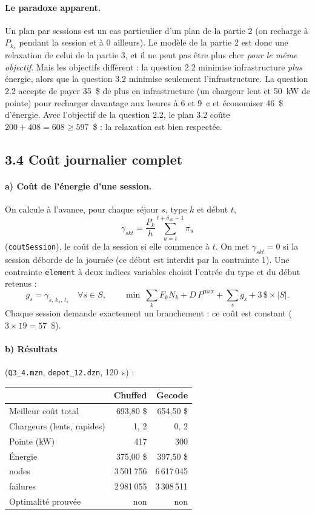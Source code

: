 \documentclass{article}
\begin{document}
\paragraph{Le paradoxe apparent.} Un plan par sessions est un cas particulier d'un plan de la partie 2 (on recharge à $P_{k_s}$ pendant la session et à 0 ailleurs). Le modèle de la partie 2 est donc une relaxation de celui de la partie 3, et il ne peut pas être plus cher \emph{pour le même objectif}. Mais les objectifs diffèrent : la question 2.2 minimise infrastructure \emph{plus} énergie, alors que la question 3.2 minimise seulement l'infrastructure. La question 2.2 accepte de payer 35~\$ de plus en infrastructure (un chargeur lent et 50~kW de pointe) pour recharger davantage aux heures à 6 et 9~¢ et économiser 46~\$ d'énergie. Avec l'objectif de la question 2.2, le plan 3.2 coûte $200 + 408 = 608 \geq 597$~\$ : la relaxation est bien respectée.

\subsection*{3.4 Coût journalier complet}

\paragraph{a) Coût de l'énergie d'une session.} On calcule à l'avance, pour chaque séjour $s$, type $k$ et début $t$,
\[ \gamma_{skt} = \frac{P_k}{h} \sum_{u=t}^{t+\delta_{sk}-1} \pi_u \]
(\texttt{coutSession}), le coût de la session si elle commence à $t$. On met $\gamma_{skt} = 0$ si la session déborde de la journée (ce début est interdit par la contrainte 1). Une contrainte \texttt{element} à deux indices variables choisit l'entrée du type et du début retenus :
\[ g_s = \gamma_{s,\,k_s,\,t_s} \quad \forall s \in S, \qquad
   \min\ \sum_{k} F_k N_k + D\,P^{\max} + \sum_{s} g_s + 3\,\$ \times |S|. \]
Chaque session demande exactement un branchement : ce coût est constant ($3 \times 19 = 57$~\$).

\paragraph{b) Résultats} (\texttt{Q3\_4.mzn}, \texttt{depot\_12.dzn}, 120~s) :

\begin{center}
\begin{tabular}{lrr}
\hline
 & Chuffed & Gecode \\
\hline
Meilleur coût total & 693,80 \$ & 654,50 \$ \\
Chargeurs (lents, rapides) & 1, 2 & 0, 2 \\
Pointe (kW) & 417 & 300 \\
Énergie & 375,00 \$ & 397,50 \$ \\
nodes & 3\,501\,756 & 6\,617\,045 \\
failures & 2\,981\,055 & 3\,308\,511 \\
Optimalité prouvée & non & non \\
\hline
\end{tabular}
\end{center}
\end{document}
